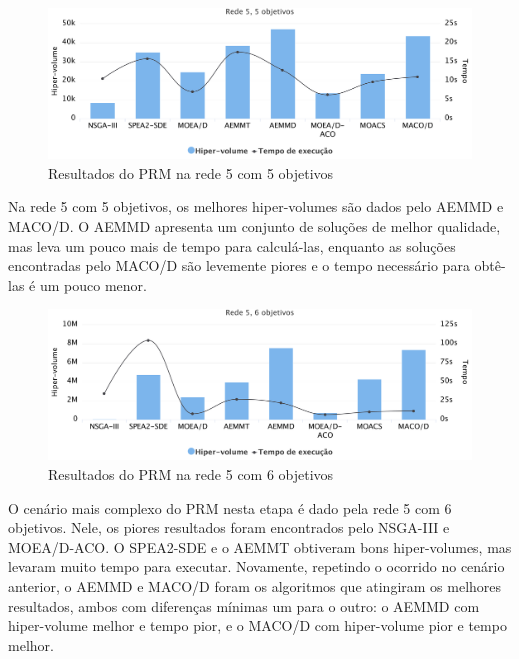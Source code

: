 \begin{figure}[!htbp]
	\caption{Resultados do PRM na rede 5 com 5 objetivos}
	\label{fig_exp4_r5o5}
	\includegraphics[width=1\textwidth]{cap_experimentos/figs/etapa4/r5o5}
\end{figure}

Na rede 5 com 5 objetivos, os melhores hiper-volumes são dados pelo AEMMD e MACO/D. O AEMMD apresenta um conjunto de soluções de melhor qualidade, mas leva um pouco mais de tempo para calculá-las, enquanto as soluções encontradas pelo MACO/D são levemente piores e o tempo necessário para obtê-las é um pouco menor.

\begin{figure}[!htbp]
	\caption{Resultados do PRM na rede 5 com 6 objetivos}
	\label{fig_exp4_r5o6}
	\includegraphics[width=1\textwidth]{cap_experimentos/figs/etapa4/r5o6}
\end{figure}

O cenário mais complexo do PRM nesta etapa é dado pela rede 5 com 6 objetivos. Nele, os piores resultados foram encontrados pelo NSGA-III e MOEA/D-ACO. O SPEA2-SDE e o AEMMT obtiveram bons hiper-volumes, mas levaram muito tempo para executar. Novamente, repetindo o ocorrido no cenário anterior, o AEMMD e MACO/D foram os algoritmos que atingiram os melhores resultados, ambos com diferenças mínimas um para o outro: o AEMMD com hiper-volume melhor e tempo pior, e o MACO/D com hiper-volume pior e tempo melhor.


